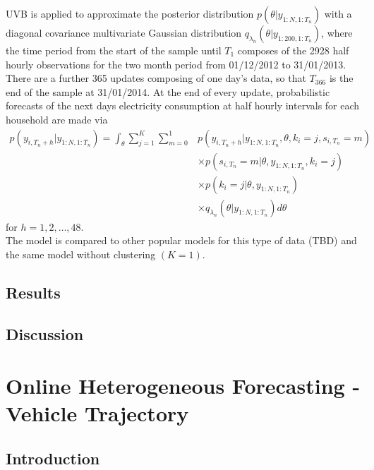 \documentclass[
12pt, %
onehalfspacing, %
nohyperref, %
headsepline, %
chapterinoneline, %
]{MastersDoctoralThesis} %
\begin{document}
UVB is applied to approximate the posterior distribution $p(\theta | y_{1:N, 1:T_n})$ with a diagonal covariance multivariate Gaussian distribution $q_{\lambda_n}(\theta | y_{1:200, 1:T_n})$, where the time period from the start of the sample until $T_1$ composes of the 2928 half hourly observations for the two month period from 01/12/2012 to 31/01/2013. There are a further 365 updates composing of one day's data, so that $T_366$ is the end of the sample at 31/01/2014. At the end of every update, probabilistic forecasts of the next days electricity consumption at half hourly intervals for each household are made via
\begin{align}
p(y_{i, T_n+h} | y_{1:N, 1:T_n}) = \int_{\theta} \sum_{j=1}^K \sum_{m=0}^1 &p(y_{i, T_n+h} | y_{1:N, 1:T_n}, \theta, k_i = j, s_{i, T_n} = m) \nonumber \\
&\times p(s_{i, T_n} = m | \theta, y_{1:N, 1:T_n}, k_i = j) \nonumber \\
&\times p(k_i = j | \theta, y_{1:N, 1:T_n}) \nonumber \\
&\times q_{\lambda_n}(\theta | y_{1:N, 1:T_n}) d\theta 
\end{align}
for $h = 1, 2, \ldots, 48$.
\\

The model is compared to other popular models for this type of data (TBD) and the same model without clustering $(K = 1)$.


\section{Results}
\label{sec:elecResults}

\section{Discussion}
\label{Sec:elecDisc}

\chapter{Online Heterogeneous Forecasting - Vehicle Trajectory}
\label{chap:cars}

\section{Introduction}
\label{sec:carsIntro}
\end{document}
